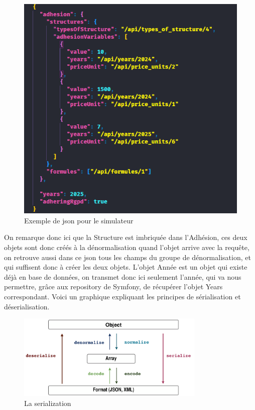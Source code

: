 \documentclass[a4paper,12pt]{report}
\begin{document}
\begin{figure}[H]
    \centering
    \includegraphics[scale=0.6]{jsonSimu.png}
    \caption{Exemple de json pour le simulateur}
    \label{fig:json-simu}
\end{figure}

On remarque donc ici que la Structure est imbriquée dans l'Adhésion, ces deux objets sont donc créés à la dénormalisation quand l'objet arrive avec la requête, on retrouve aussi dans ce json tous les champs du groupe de dénormalisation, et qui suffisent donc à créer les deux objets. L'objet Année est un objet qui existe déjà en base de données, on transmet donc ici seulement l'année, qui va nous permettre, grâce aux repository de Symfony, de récupérer l'objet Years correspondant. Voici un graphique expliquant les principes de sérialisation et déserialisation.

\begin{figure}[H]
    \centering
    \includegraphics[width=0.8\textwidth]{SerializerWorkflow.png}
    \caption{La serialization}
    \label{fig:serialization}
\end{figure}
\end{document}
